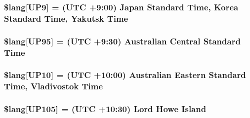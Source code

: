 \subsubsection[{\$lang}]{\setlength{\rightskip}{0pt plus 5cm}\$lang\mbox{[}\textquotesingle{}U\+P9\textquotesingle{}\mbox{]} = \textquotesingle{}(U\+T\+C +9\+:00) Japan Standard Time, Korea Standard Time, Yakutsk Time\textquotesingle{}}\label{system_2language_2english_2date__lang_8php_aa112bfd057369e5adb437c55457c9f79}
\hypertarget{system_2language_2english_2date__lang_8php_a96965669ac4830ab024b39a4ebb763f1}{}
\subsubsection[{\$lang}]{\setlength{\rightskip}{0pt plus 5cm}\$lang\mbox{[}\textquotesingle{}U\+P95\textquotesingle{}\mbox{]} = \textquotesingle{}(U\+T\+C +9\+:30) Australian Central Standard Time\textquotesingle{}}\label{system_2language_2english_2date__lang_8php_a96965669ac4830ab024b39a4ebb763f1}
\hypertarget{system_2language_2english_2date__lang_8php_ab55df5b1ac6457c16ea32f01070966f6}{}
\subsubsection[{\$lang}]{\setlength{\rightskip}{0pt plus 5cm}\$lang\mbox{[}\textquotesingle{}U\+P10\textquotesingle{}\mbox{]} = \textquotesingle{}(U\+T\+C +10\+:00) Australian Eastern Standard Time, Vladivostok Time\textquotesingle{}}\label{system_2language_2english_2date__lang_8php_ab55df5b1ac6457c16ea32f01070966f6}
\hypertarget{system_2language_2english_2date__lang_8php_aeb674ae9d76fd6d0d9c9e77ed5a212e9}{}
\subsubsection[{\$lang}]{\setlength{\rightskip}{0pt plus 5cm}\$lang\mbox{[}\textquotesingle{}U\+P105\textquotesingle{}\mbox{]} = \textquotesingle{}(U\+T\+C +10\+:30) Lord Howe Island\textquotesingle{}}\label{system_2language_2english_2date__lang_8php_aeb674ae9d76fd6d0d9c9e77ed5a212e9}
\hypertarget{system_2language_2english_2date__lang_8php_a463ad4d63523352c17685f734b4ec7cc}{}
